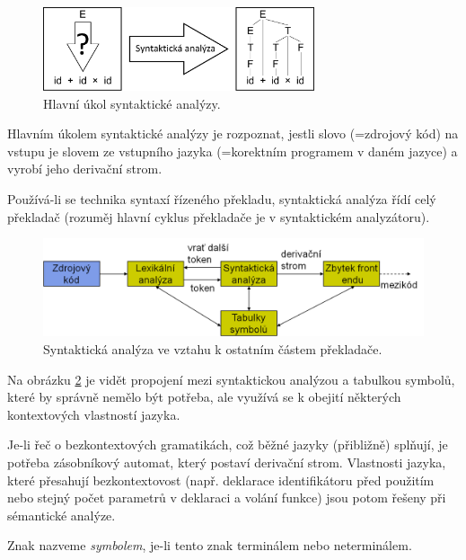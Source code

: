\begin{figure}[h]
	\centering
	\includegraphics[width=8cm]{i2/softwarove_inzenyrstvi/obrazky/Syntakticka_analyza.pdf}
	\caption{Hlavní úkol syntaktické analýzy.}
	\label{pic:Syntakticka_analyza}
\end{figure}

Hlavním úkolem syntaktické analýzy je rozpoznat, jestli slovo (=zdrojový kód) na vstupu je slovem ze vstupního jazyka (=korektním programem v daném jazyce) a vyrobí jeho derivační strom.

Používá-li se technika syntaxí řízeného překladu, syntaktická analýza řídí celý překladač (rozuměj hlavní cyklus překladače je v syntaktickém analyzátoru).

\begin{figure}[h]
	\centering
	\includegraphics[width=13cm]{i2/softwarove_inzenyrstvi/obrazky/Syntakticka_analyza_v_prekladaci.png}
	\caption{Syntaktická analýza ve vztahu k ostatním částem překladače.}
	\label{pic:Syntakticka_analyza_v_prekladaci}
\end{figure}

Na obrázku \ref{pic:Syntakticka_analyza_v_prekladaci} je vidět propojení mezi syntaktickou analýzou a tabulkou symbolů, které by správně nemělo být potřeba, ale využívá se k obejití některých kontextových vlastností jazyka.

Je-li řeč o bezkontextových gramatikách, což běžné jazyky (přibližně) splňují, je potřeba zásobníkový automat, který postaví derivační strom. Vlastnosti jazyka, které přesahují bezkontextovost (např. deklarace identifikátoru před použitím nebo stejný počet parametrů v deklaraci a volání funkce) jsou potom řešeny při sémantické analýze.

\begin{definice}
	Znak nazveme \emph{symbolem}, je-li tento znak terminálem nebo neterminálem.
\end{definice}


